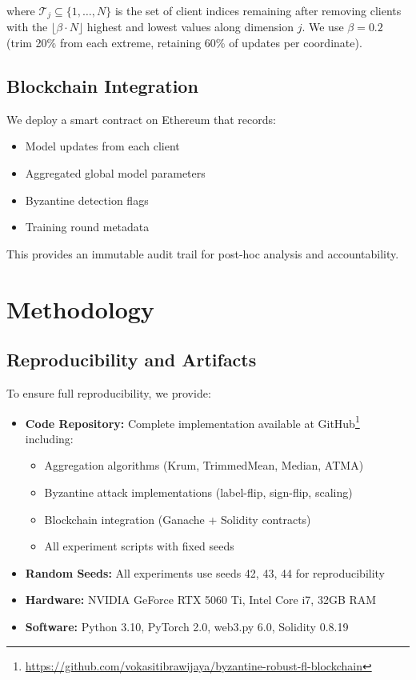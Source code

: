 \documentclass{ieeeaccess}
\begin{document}
where $\mathcal{T}_j \subseteq \{1,\ldots,N\}$ is the set of client indices remaining after removing clients with the $\lfloor\beta \cdot N\rfloor$ highest and lowest values along dimension $j$. We use $\beta = 0.2$ (trim 20\% from each extreme, retaining 60\% of updates per coordinate).

\subsection{Blockchain Integration}

We deploy a smart contract on Ethereum that records:
\begin{itemize}
    \item Model updates from each client
    \item Aggregated global model parameters
    \item Byzantine detection flags
    \item Training round metadata
\end{itemize}

This provides an immutable audit trail for post-hoc analysis and accountability.

\section{Methodology}
\label{sec:methodology}

\subsection{Reproducibility and Artifacts}

To ensure full reproducibility, we provide:
\begin{itemize}
    \item \textbf{Code Repository:} Complete implementation available at GitHub\footnote{\url{https://github.com/vokasitibrawijaya/byzantine-robust-fl-blockchain}} including:
    \begin{itemize}
        \item Aggregation algorithms (Krum, TrimmedMean, Median, ATMA)
        \item Byzantine attack implementations (label-flip, sign-flip, scaling)
        \item Blockchain integration (Ganache + Solidity contracts)
        \item All experiment scripts with fixed seeds
    \end{itemize}
    \item \textbf{Random Seeds:} All experiments use seeds 42, 43, 44 for reproducibility
    \item \textbf{Hardware:} NVIDIA GeForce RTX 5060 Ti, Intel Core i7, 32GB RAM
    \item \textbf{Software:} Python 3.10, PyTorch 2.0, web3.py 6.0, Solidity 0.8.19
\end{itemize}
\end{document}
